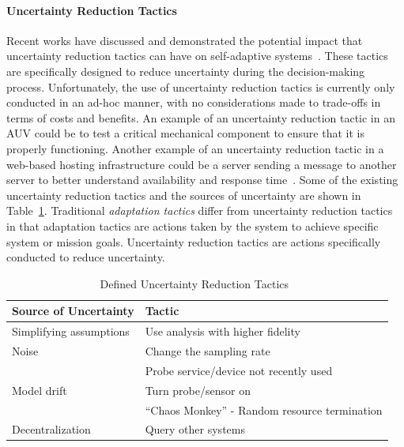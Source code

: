 \documentclass[12pt]{article}
\begin{document}
\vspace{-7mm}\paragraph{Uncertainty Reduction Tactics} Recent works have discussed and demonstrated the potential impact that uncertainty reduction tactics can have on self-adaptive systems~\cite{moreno2018uncertainty,esfahani2013uncertainty,mahdavi2016classification,Ramirez:2012:TUD:2666795.2666812, camara2017uncertainty}. These tactics are specifically designed to reduce uncertainty during the decision-making process. Unfortunately, the use of uncertainty reduction tactics is currently only conducted in an ad-hoc manner, with no considerations made to trade-offs in terms of costs and benefits. An example of an uncertainty reduction tactic in an AUV could be to test a critical mechanical component to ensure that it is properly functioning. Another example of an uncertainty reduction tactic in a web-based hosting infrastructure could be a server sending a message to another server to better understand availability and response time~\cite{Hielscher:2008:FPS:1504902.1504917}. Some of the existing uncertainty reduction tactics and the sources of uncertainty are shown in Table~\ref{table:ExistingUncertaintyReductionTactics}. Traditional \emph{adaptation tactics} differ from uncertainty reduction tactics in that adaptation tactics are actions taken by the system to achieve specific system or mission goals. Uncertainty reduction tactics are actions specifically conducted to reduce uncertainty.

\begin{table}[h!]
\begin{center}
\caption{Defined Uncertainty Reduction Tactics~\cite{moreno2018uncertainty, esfahani2013uncertainty}}
\label{table:ExistingUncertaintyReductionTactics}
\begin{tabular}{| l | l | } \hline 

  \bfseries \cellcolor{LightGray}Source of Uncertainty& \bfseries \cellcolor{LightGray}Tactic \\ \hline

	Simplifying assumptions & Use analysis with higher fidelity \\ \hline
	 Noise & Change the sampling rate \\ \hline
 
	 \multirow{3}{6em}{Model drift} & Probe service/device not recently used \\ \cline{2-2}
 	& Turn probe/sensor on \\ \cline{2-2}
 	& ``Chaos Monkey''  - Random resource termination\\ \hline
	Decentralization & Query other systems \\ \hline

   \end{tabular}
  \end{center}
\end{table}
\end{document}
